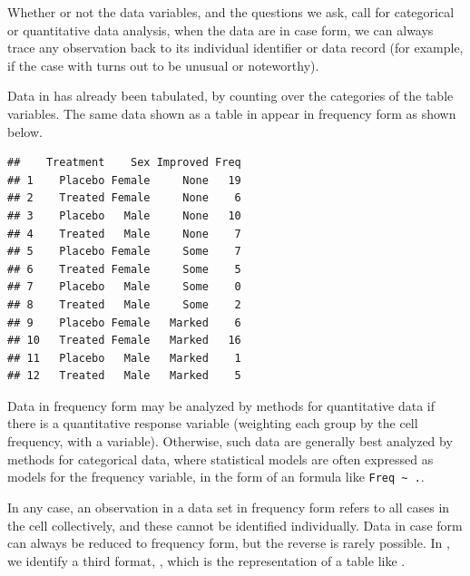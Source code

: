 \documentclass[11pt]{book}
\renewenvironment{knitrout}{\small\renewcommand{\baselinestretch}{.85}}{} %
\begin{document}
Whether or not the data variables, and the questions we ask, call for
categorical or quantitative data analysis, 
when the data are in case form,
we can always trace
any observation back to its individual identifier or data record
(for example, if the case with  turns out to be unusual
or noteworthy).

Data in  
has already been tabulated, by counting over the categories of the
table variables. The same data shown as a table in 
 appear in frequency form as shown below.
\begin{knitrout}
\color{fgcolor}\begin{kframe}
\begin{alltt}
\hlstd{(}\hlstd{(}\hlopt{~}\hlopt{+}\hlopt{+} 
\end{alltt}
\begin{verbatim}
##    Treatment    Sex Improved Freq
## 1    Placebo Female     None   19
## 2    Treated Female     None    6
## 3    Placebo   Male     None   10
## 4    Treated   Male     None    7
## 5    Placebo Female     Some    7
## 6    Treated Female     Some    5
## 7    Placebo   Male     Some    0
## 8    Treated   Male     Some    2
## 9    Placebo Female   Marked    6
## 10   Treated Female   Marked   16
## 11   Placebo   Male   Marked    1
## 12   Treated   Male   Marked    5
\end{verbatim}
\end{kframe}
\end{knitrout}

Data in frequency form may be analyzed by methods
for quantitative data if there is a quantitative response variable
(weighting each group by the cell frequency, with a 
variable).  
Otherwise, such data are generally
best analyzed by methods for categorical data, where
statistical models are often expressed as models for the
frequency variable, in the form of an \R formula
like \verb|Freq ~ .|.

In any case, an observation in a data set in
frequency form refers
to all cases in the cell collectively, and these cannot be identified individually.
Data in case form can always be reduced to frequency form,
but the reverse is rarely possible. In ,
we identify a third format, , which is the
\R representation of a table like .
\end{document}
